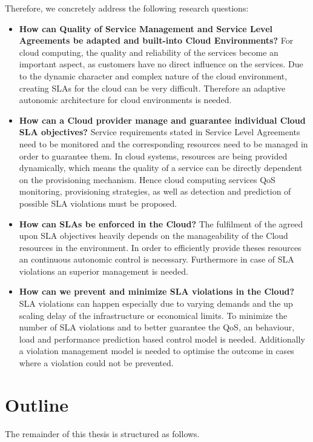 Therefore, we concretely address the following research questions:
\begin{itemize} 
\item \textbf{How can Quality of Service Management and Service Level Agreements be  adapted and built-into Cloud Environments?}
For cloud computing, the quality and reliability of the services become an important aspect, as customers have no direct influence on the services. Due to the dynamic character and complex nature of the cloud environment, creating SLAs for the cloud can be very difficult. Therefore an adaptive autonomic architecture for cloud environments is needed.

\item \textbf{How can a Cloud provider manage and guarantee individual Cloud SLA objectives?}
Service requirements stated in Service Level Agreements need to be monitored and the corresponding resources need to be managed in order to guarantee them. In cloud systems, resources are being provided dynamically, which means the quality of a service can be directly
dependent on the provisioning mechanism. Hence  cloud computing services QoS monitoring, provisioning strategies, as well as detection and prediction of possible SLA violations must be proposed.

\item  \textbf{How can SLAs be enforced in the Cloud?}
The fulfilment of the agreed upon SLA objectives heavily depends on the manageability of the Cloud resources in the environment.
In order to efficiently provide theses resources an continuous autonomic control is necessary. Furthermore in case of SLA violations an superior management is needed.

\item  \textbf{How can we prevent and minimize SLA violations in the Cloud?}
SLA violations can happen especially due to varying demands and the up scaling delay of the infrastructure or economical limits. To minimize the number of SLA violations and to better guarantee the QoS, an behaviour, load and performance prediction based control model is needed. Additionally a violation management model is needed to optimise the outcome in cases where a violation could not be prevented.
\end{itemize} 




\section{Outline}
The remainder of this thesis is structured as follows. 

